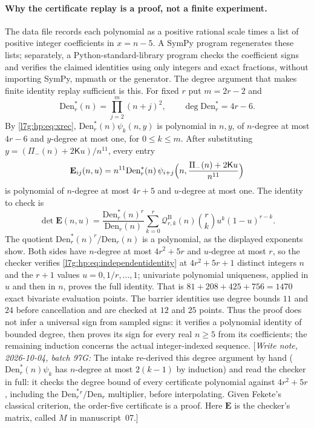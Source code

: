 \documentclass[11pt,letterpaper]{article}
\theoremstyle{remark}\newtheorem{remark}[theorem]{Remark}
\newcommand{\hpnote}[1]{\textup{[}\emph{Write note, 2026-10-04, batch 97G:} #1\textup{]}}
\newcounter{l7gtrsavedeq}
\begin{document}
\paragraph{Why the certificate replay is a proof, not a finite experiment.}
The data file records each polynomial as a positive rational scale times a
list of positive integer coefficients in $x=n-5$. A SymPy program
regenerates these lists; separately, a Python-standard-library program
checks the coefficient signs and verifies the claimed identities using only
integers and exact fractions, without importing SymPy, mpmath or the
generator. The degree argument that makes finite identity replay sufficient
is this. For fixed $r$ put $m=2r-2$ and
\[
 \mathrm{Den}^*_r(n)=\prod_{j=2}^{m}(n+j)^2,\qquad \deg\mathrm{Den}^*_r=4r-6.
\]
By \eqref{l7g:hp:eq:xrec}, $\mathrm{Den}^*_r(n)\psi_k(n,y)$ is polynomial in
$n,y$, of $n$-degree at most $4r-6$ and $y$-degree at most one, for $0\le
k\le m$. After substituting $y=(\Pi_-(n)+2\mathsf Ku)/n^{11}$, every entry
\[
 \mathbf E_{ij}(n,u)=n^{11}\mathrm{Den}^*_r(n)\,
 \psi_{i+j}\Bigl(n,\frac{\Pi_-(n)+2\mathsf Ku}{n^{11}}\Bigr)
\]
is polynomial of $n$-degree at most $4r+5$ and $u$-degree at most one. The
identity to check is
\begin{equation}\label{l7g:hp:eq:independentidentity}
 \det\mathbf E(n,u)=\frac{\mathrm{Den}^*_r(n)^r}{\mathrm{Den}_r(n)}
 \sum_{k=0}^r\mathcal Q^{\mathrm B}_{r,k}(n)\binom rk u^k(1-u)^{r-k}.
\end{equation}
The quotient $\mathrm{Den}^*_r(n)^r/\mathrm{Den}_r(n)$ is a polynomial, as
the displayed exponents show. Both sides have $n$-degree at most $4r^2+5r$
and $u$-degree at most $r$, so the checker verifies
\eqref{l7g:hp:eq:independentidentity} at $4r^2+5r+1$ distinct integers $n$
and the $r+1$ values $u=0,1/r,\dots,1$; univariate polynomial uniqueness,
applied in $u$ and then in $n$, proves the full identity. That is
$81+208+425+756=1470$ exact bivariate evaluation points. The barrier
identities use degree bounds $11$ and $24$ before cancellation and are
checked at $12$ and $25$ points. Thus the proof does not infer a universal
sign from sampled signs: it verifies a polynomial identity of bounded
degree, then proves its sign for every real $n\ge5$ from its coefficients;
the remaining induction concerns the actual integer-indexed sequence.
\hpnote{The intake re-derived this degree argument by hand
($\mathrm{Den}^*_r(n)\psi_k$ has $n$-degree at most $2(k-1)$ by induction)
and read the checker in full: it checks the degree bound of every
certificate polynomial against $4r^2+5r$, including the
$\mathrm{Den}^*_r{}^r/\mathrm{Den}_r$ multiplier, before interpolating.
Given Fekete's classical criterion, the order-five certificate is a proof.
Here $\mathbf E$ is the checker's matrix, called $M$ in manuscript~07.}
\end{document}
